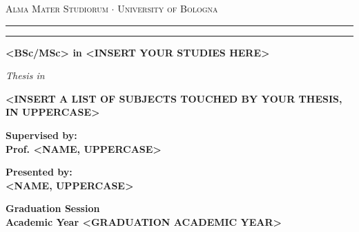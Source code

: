 \begin{titlepage}
    \begin{center}
    {{\Large{
        \textsc{Alma Mater Studiorum $\cdot$ University of Bologna}
    }}}
    \rule[0.1cm]{15.8cm}{0.1mm}
    \rule[0.5cm]{15.8cm}{0.6mm}
    {\small{\bf <BSc/MSc> in <INSERT YOUR STUDIES HERE>}}
    \vspace{41mm} %
    \end{center}
    \begin{center}
        \huge\bf <INSERT YOUR THESIS TITLE HERE, IN UPPERCASE>
    \end{center}
    \vspace{41mm} %
    \begin{center}
    {{\emph{Thesis in}}}
    
    \vspace{1mm}
    {{\bf{<INSERT A LIST OF SUBJECTS TOUCHED BY YOUR THESIS, IN UPPERCASE>}}}
    \vspace{18mm}
    \end{center}
    \par
    \noindent
    \begin{minipage}[t]{0.47\textwidth}
    {\large{\bf Supervised by:\\
    Prof. <NAME, UPPERCASE>}}
    \end{minipage}
    \hfill
    \begin{minipage}[t]{0.47\textwidth}\raggedleft
    {\large{\bf Presented by:\\
    <NAME, UPPERCASE>}}
    \end{minipage}
    \vspace{20mm}
    \begin{center}
    {\large{\bf <ORDINAL NUMBER> Graduation Session\\
    Academic Year <GRADUATION ACADEMIC YEAR>}}
    \end{center}
\end{titlepage}
